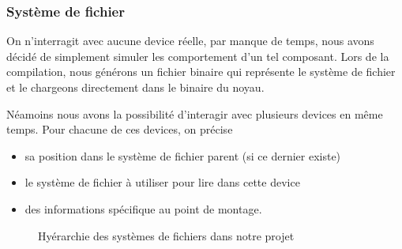 \documentclass[10pt,a4paper]{beamer}
\begin{document}
\begin{frame}
  \frametitle{Système de fichier}

  On n'interragit avec aucune device réelle, par manque de temps, nous avons décidé de simplement simuler les comportement d'un tel composant. Lors de la compilation, nous générons un fichier binaire qui représente le système de fichier et le chargeons directement dans le binaire du noyau.


  Néamoins nous avons la possibilité d'interagir avec plusieurs devices en même temps. Pour chacune de ces devices, on précise
  \begin{itemize}
  \item sa position dans le système de fichier parent (si ce dernier existe)
  \item le système de fichier à utiliser pour lire dans cette device
  \item des informations spécifique au point de montage.
  \end{itemize}

  \begin{figure}
    \begin{center}
      \caption{Hyérarchie des systèmes de fichiers dans notre projet}
    \end{center}
  \end{figure}

\end{frame}
\end{document}
